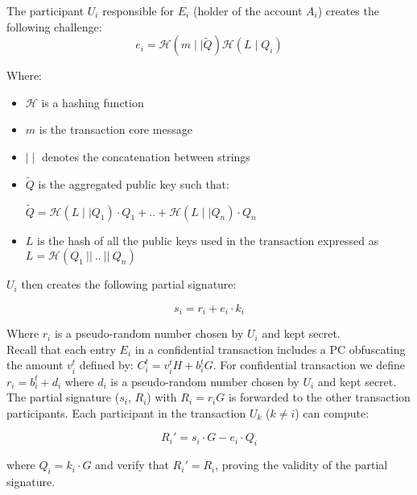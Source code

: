 The participant $U_i$ responsible for $E_i$ (holder of the account $A_i$) creates the following challenge:
\begin{equation} 
e_i = \mathcal{H}(m \mid\mid \tilde{Q})\mathcal{H}(L \mid Q_i)
\end{equation} 

Where:

\begin{itemize}
	\item$\mathcal{H}$ is a hashing function
	\item$m$ is the transaction core message 
	\item$\mid\mid$ denotes the concatenation between strings
	\item$\tilde{Q}$ is the aggregated public key such that:
\begin{center}
$\tilde{Q}=\mathcal{H}(L \mid\mid Q_1)\cdot Q_1 + .. + \mathcal{H}(L \mid\mid Q_n)\cdot Q_n$
\end{center}
	\item$L$ is the hash of all the public keys used in the transaction expressed as $L=\mathcal{H}(Q_1~||~..~||~Q_n)$
\end{itemize}

$U_i$ then creates the following partial signature:  

\begin{equation} 
s_{i} = r_i + e_i\cdot k_i
\end{equation}

Where $r_i$ is a pseudo-random number chosen by $U_i$ and kept secret.\\

 Recall that each entry $E_i$ in a confidential transaction includes a PC obfuscating the amount $v_i^{t}$ defined by: $C_i^{t} = v_i ^{t} H + b_i^{t} G$. For confidential transaction we define $r_i = b_i^t + d_i$ where $d_i$ is a pseudo-random number chosen by $U_i$ and kept secret.\\

The partial signature ($s_i$, $R_i$) with $R_i = r_iG$ is forwarded to the other transaction participants. Each participant in the transaction $U_k$ ($k\neq i$) can compute:

\begin{equation} 
R_i' = s_{i}\cdot G - e_i\cdot Q_i
\end{equation}

where $Q_i = k_i\cdot G$ and verify that $R_i' = R_i$, proving the validity of the partial signature. \\


